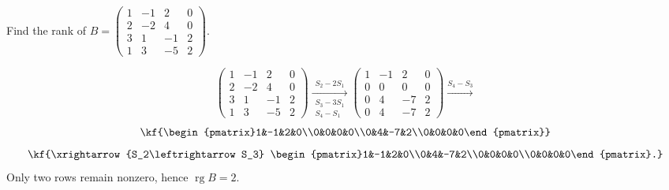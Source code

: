 \begin{misol}
Find the rank of
$B=\begin{pmatrix}1&-1&2&0\\2&-2&4&0\\3&1&-1&2\\1&3&-5&2\end{pmatrix}$.
\begin{yechish}
$$
\begin{pmatrix}1&-1&2&0\\2&-2&4&0\\3&1&-1&2\\1&3&-5&2\end{pmatrix}
\xrightarrow[\substack{S_3-3S_1 \\ S_4-S_1}]{S_2-2S_1}
\begin{pmatrix}1&-1&2&0\\0&0&0&0\\0&4&-7&2\\0&4&-7&2\end{pmatrix}
\xrightarrow{S_4-S_3}
$$
\[\kf{\begin{pmatrix}1&-1&2&0\\0&0&0&0\\0&4&-7&2\\0&0&0&0\end{pmatrix}}\]
\[\kf{\xrightarrow{S_2\leftrightarrow S_3}
\begin{pmatrix}1&-1&2&0\\0&4&-7&2\\0&0&0&0\\0&0&0&0\end{pmatrix}.}\]
Only two rows remain nonzero, hence $\operatorname{rg}B = 2$.
\end{yechish}
\end{misol}
